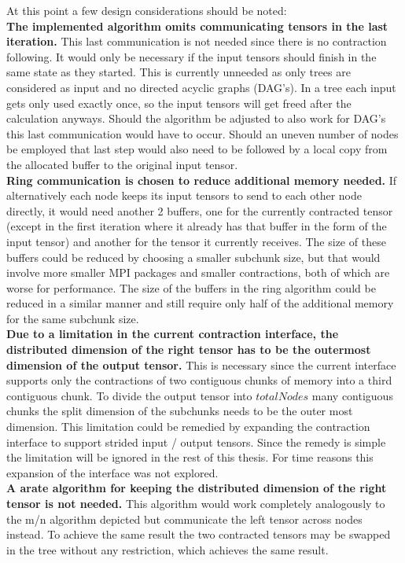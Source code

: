 At this point a few design considerations should be noted:\\
\textbf{The implemented algorithm omits communicating tensors in the last iteration.}
This last communication is not needed since there is no contraction following.
It would only be necessary if the input tensors should finish in the same state as they started.
This is currently unneeded as only trees are considered as input and no directed acyclic graphs (DAG's).
In a tree each input gets only used exactly once, so the input tensors will get freed after the calculation anyways.
Should the algorithm be adjusted to also work for DAG's this last communication would have to occur.
Should an uneven number of nodes be employed that last step would also need to be followed by a local copy from the allocated buffer to the original input tensor.\\
\textbf{Ring communication is chosen to reduce additional memory needed.}
If alternatively each node keeps its input tensors to send to each other node directly, it would need another 2 buffers, one for the currently contracted tensor (except in the first iteration where it already has that buffer in the form of the input tensor) and another for the tensor it currently receives.
The size of these buffers could be reduced by choosing a smaller subchunk size, but that would involve more smaller MPI packages and smaller contractions, both of which are worse for performance.
The size of the buffers in the ring algorithm could be reduced in a similar manner and still require only half of the additional memory for the same subchunk size.\\
\textbf{Due to a limitation in the current contraction interface, the distributed dimension of the right tensor has to be the outermost dimension of the output tensor.}
This is necessary since the current interface supports only the contractions of two contiguous chunks of memory into a third contiguous chunk.
To divide the output tensor into $totalNodes$ many contiguous chunks the split dimension of the subchunks needs to be the outer most dimension.
This limitation could be remedied by expanding the contraction interface to support strided input / output tensors.
Since the remedy is simple the limitation will be ignored in the rest of this thesis.
For time reasons this expansion of the interface was not explored.\\
\textbf{A arate algorithm for keeping the distributed dimension of the right tensor is not needed.}
This algorithm would work completely analogously to the m/n algorithm depicted but communicate the left tensor across nodes instead.
To achieve the same result the two contracted tensors may be swapped in the tree without any restriction, which achieves the same result.

